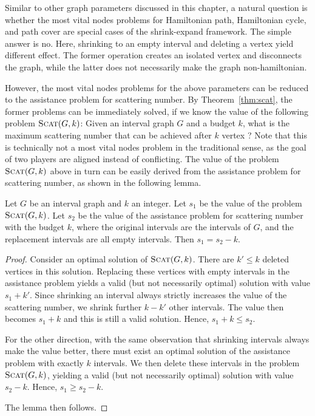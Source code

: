 Similar to other graph parameters discussed in this chapter, a natural question is whether the most vital nodes problems for Hamiltonian path, Hamiltonian cycle, and path cover are special cases of the shrink-expand framework.
The simple answer is no.
Here, shrinking to an empty interval and deleting a vertex yield different effect.
The former operation creates an isolated vertex and disconnects the graph, while the latter does not necessarily make the graph non-hamiltonian.

However, the most vital nodes problems for the above parameters can be reduced to the assistance problem for scattering number.
By Theorem~\ref{thm:scat}, the former problems can be immediately solved, if we know the value of the following problem $\textsc{Scat}(G,k)$: Given an interval graph $G$ and a budget $k$, what is the maximum scattering number that can be achieved after $k$ vertex ?
Note that this is technically not a most vital nodes problem in the traditional sense, as the goal of two players are aligned instead of conflicting.
The value of the problem $\textsc{Scat}(G,k)$ above in turn can be easily derived from the assistance problem for scattering number, as shown in the following lemma.

\begin{lemma}
Let $G$ be an interval graph and $k$ an integer.
Let $s_1$ be the value of the problem $\textsc{Scat}(G,k)$.
Let $s_2$ be the value of the assistance problem for scattering number with the budget $k$, where the original intervals are the intervals of $G$, and the replacement intervals are all empty intervals.
Then $s_1 = s_2 - k$.
\end{lemma}
\begin{proof}
Consider an optimal solution of $\textsc{Scat}(G,k)$.
There are $k' \leq k$ deleted vertices in this solution.
Replacing these vertices with empty intervals in the assistance problem yields a valid (but not necessarily optimal) solution with value $s_1 + k'$.
Since shrinking an interval always strictly increases the value of the scattering number, we shrink further $k - k'$ other intervals.
The value then becomes $s_1 + k$ and this is still a valid solution.
Hence, $s_1 + k \leq s_2$.

For the other direction, with the same observation that shrinking intervals always make the value better, there must exist an optimal solution of the assistance problem with exactly $k$  intervals.
We then delete these intervals in the problem $\textsc{Scat}(G,k)$, yielding a valid (but not necessarily optimal) solution with value $s_2 - k$.
Hence, $s_1 \geq s_2 - k$.

The lemma then follows. 
\end{proof}

